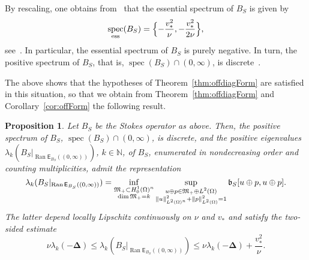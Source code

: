 \documentclass[11pt,a4paper]{amsart}
\numberwithin{equation}{section}
\DeclareMathOperator{\Ran}{Ran}
\DeclareMathOperator{\spec}{spec}
\DeclarePairedDelimiter{\norm}{\lVert}{\rVert}
\newcommand{\ess}{\mathrm{ess}}
\newcommand{\NN}{\mathbb{N}}
\newcommand{\EE}{\mathsf{E}}
\newcommand{\fb}{{\mathfrak b}}
\newcommand{\fM}{{\mathfrak M}}
\theoremstyle{plain}
\newtheorem{proposition}[theorem]{Proposition}
\theoremstyle{definition}
\theoremstyle{remark}
\begin{document}
By rescaling, one obtains from~\cite[Theorem~3.15]{FFMM00} that the essential spectrum of $B_S$ is given by
\begin{equation*}
  \spec_\ess(B_S)
  =
  \Bigl\{ -\frac{v_*^2}{\nu} , -\frac{v_*^2}{2\nu}  \Bigr\}
  ,
\end{equation*}
see~\cite[Remark~2.2]{GKMSV19}. In particular, the essential spectrum of $B_S$ is purely negative. In turn, the positive spectrum
of $B_S$, that is, $\spec(B_S) \cap (0,\infty)$, is discrete~\cite[Theorem~2.1\,(i)]{GKMSV19}.

The above shows that the hypotheses of Theorem~\ref{thm:offdiagForm} are satisfied in this situation, so that we obtain from
Theorem~\ref{thm:offdiagForm} and Corollary~\ref{cor:offForm} the following result.

\begin{proposition}\label{prop:Stokes}
  Let $B_S$ be the Stokes operator as above. Then, the positive spectrum of $B_S$, $\spec(B_S) \cap (0,\infty)$, is discrete, and
  the positive eigenvalues $\lambda_k(B_S|_{\Ran\EE_{B_S}((0,\infty))})$, $k \in \NN$, of $B_S$, enumerated in nondecreasing
  order and counting multiplicities, admit the representation
  \begin{equation*}
    \lambda_k(B_S|_{\Ran\EE_{B_S}((0,\infty))})
    =
    \inf_{\substack{\fM_+ \subset H_0^1(\Omega)^n\\ \dim\fM_+ = k}}
      \sup_{\substack{u \oplus p \in \fM_+ \oplus L^2(\Omega)\\ \norm{u}_{L^2(\Omega)^n}^2 + \norm{p}_{L^2(\Omega)}^2 = 1}}
      \fb_S[ u \oplus p , u \oplus p ]
    .
  \end{equation*}
  The latter depend locally Lipschitz continuously on $\nu$ and $v_*$ and satisfy the two-sided estimate
  \begin{equation*}
    \nu\lambda_k(-\mathbf{\Delta})
    \le
    \lambda_k(B_S|_{\Ran\EE_{B_S}((0,\infty))})
    \le
    \nu\lambda_k(-\mathbf{\Delta}) + \frac{v_*^2}{\nu}
    .
  \end{equation*}
\end{proposition}
\end{document}
